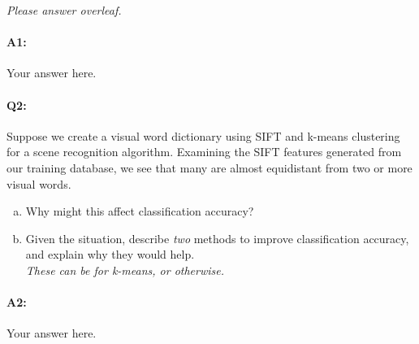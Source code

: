 \emph{Please answer overleaf.}

\pagebreak
\paragraph{A1:} Your answer here.







\pagebreak
\paragraph{Q2:} Suppose we create a visual word dictionary using SIFT and k-means clustering for a scene recognition algorithm. Examining the SIFT features generated from our training database, we see that many are almost equidistant from two or more visual words. 
\begin{enumerate}[(a)]
    \item 
    Why might this affect classification accuracy?

    \item
    Given the situation, describe \emph{two} methods to improve classification accuracy, and explain why they would help.\\ 
    \emph{These can be for k-means, or otherwise.}

\end{enumerate}


\paragraph{A2:} Your answer here.

